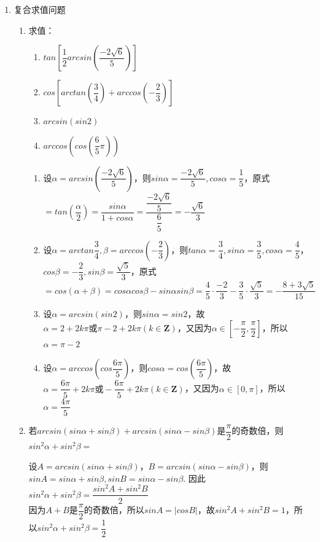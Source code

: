 \begin{enumerate}
\begin{enumerate}
\begin{jieda}
        \end{jieda}
    \end{enumerate}
\item 复合求值问题
\begin{enumerate}
    \item 求值：
    \begin{enumerate}
        \item $tan\left[\dfrac{1}{2}arcsin\left(\dfrac{-2\sqrt{6}}{5}\right)\right]$
        \item $cos\left[arctan\left(\dfrac{3}{4}\right) + arccos\left(-\dfrac{2}{3}\right)\right]$
        \item $arcsin(sin2)$
        \item $arccos\left(cos\left(\dfrac{6}{5}\pi\right)\right)$
    \end{enumerate}
    \begin{jieda}
        \begin{enumerate}
            \item 设$\alpha = arcsin(\dfrac{-2\sqrt{6}}{5})$，则$sin\alpha = \dfrac{-2\sqrt{6}}{5}, cos\alpha = \dfrac{1}{5}$，原式$ = tan(\dfrac{\alpha}{2}) = \dfrac{sin\alpha}{1+cos\alpha} = \dfrac{ \dfrac{-2\sqrt{6}}{5}}{\dfrac{6}{5}} = -\dfrac{\sqrt{6}}{3}$
            \item 设$\alpha = arctan\dfrac{3}{4}, \beta = arccos(-\dfrac{2}{3})$，则$tan\alpha = \dfrac{3}{4}, sin\alpha = \dfrac{3}{5}, cos\alpha = \dfrac{4}{5}$，$cos\beta = -\dfrac{2}{3}, sin\beta = \dfrac{\sqrt{5}}{3}$，原式$ = cos(\alpha + \beta) = cos\alpha cos\beta - sin\alpha sin\beta = \dfrac{4}{5} \cdot \dfrac{-2}{3} - \dfrac{3}{5} \cdot \dfrac{\sqrt{5}}{3} = -\dfrac{8+3\sqrt{5}}{15}$
            \item 设$\alpha = arcsin(sin2)$，则$sin\alpha = sin2$，故$\alpha = 2 + 2k\pi \mbox{或} \pi - 2 + 2k\pi (k \in \mathbf{Z})$，又因为$\alpha \in [-\dfrac{\pi}{2}, \dfrac{\pi}{2}]$，所以$\alpha = \pi - 2$
            \item 设$\alpha = arccos(cos\dfrac{6\pi}{5})$，则$cos\alpha = cos(\dfrac{6\pi}{5})$，故$\alpha = \dfrac{6\pi}{5} + 2k\pi \mbox{或} -\dfrac{6\pi}{5} + 2k\pi (k \in \mathbf{Z})$，又因为$\alpha \in [0, \pi]$，所以$\alpha = \dfrac{4\pi}{5}$
        \end{enumerate}
    \end{jieda}
    \item 若$arcsin(sin\alpha + sin\beta) + arcsin(sin\alpha - sin\beta)$是$\dfrac{\pi}{2}$的奇数倍，则$sin^2\alpha + sin^2\beta = $
    \begin{jieda}
        设$A = arcsin(sin\alpha + sin\beta)$，$B = arcsin(sin\alpha - sin\beta)$，则$sinA = sin\alpha + sin\beta, sinB = sin\alpha - sin\beta$. 因此$sin^2\alpha + sin^2\beta = \dfrac{sin^2A + sin^2B}{2}$ \\
        因为$A+B$是$\dfrac{\pi}{2}$的奇数倍，所以$sinA = |cosB|$，故$sin^2A + sin^2B = 1$，所以$sin^2\alpha + sin^2\beta = \dfrac{1}{2}$
    \end{jieda}
\end{enumerate}


\end{enumerate}
